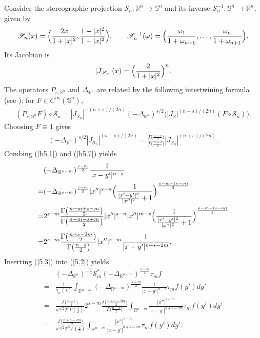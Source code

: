 \documentclass[12pt,reqno]{amsart}%
\theoremstyle{plain}
\numberwithin{equation}{section}
\begin{document}
Consider the stereographic projection \(\mathscr{S}_{n}: \mathbb{R}^n \to \mathbb{S}^n\) and its inverse \(\mathscr{S}_{n}^{-1}: \mathbb{S}^n \to \mathbb{R}^n\), given by
\[
\mathscr{S}_{n}(x) = \Bigl( \frac{2x}{1+|x|^2}, \frac{1-|x|^2}{1+|x|^2} \Bigr),\qquad
\mathscr{S}_{n}^{-1}(\omega) = \Bigl( \frac{\omega_1}{1+\omega_{n+1}},\dots, \frac{\omega_n}{1+\omega_{n+1}} \Bigr).
\]
Its Jacobian is
\begin{align}\label{Jacobian}
|J_{\mathscr{S}_{n}}|(x) = \Bigl( \frac{2}{1+|x|^2} \Bigr)^n.
\end{align}
The operators \(P_{s,\mathbb{S}^{n}}\) and \(\Delta_{\mathbb{R}^{n}}\) are related by the following intertwining formula (see \cite{Morpurgo}): for \(F\in C^{\infty}(\mathbb{S}^{n})\),
\begin{align}\label{5.6}
(P_{s,\mathbb{S}^{n}} F) \circ \mathscr{S}_{n}
= |J_{\mathscr{S}_{n}}|^{-(n+s)/(2n)}
(-\Delta_{\mathbb{R}^{n}})^{s/2}\bigl( |J_{\mathscr{S}}|^{(n-s)/(2n)} (F \circ \mathscr{S}_{n}) \bigr).
\end{align}
Choosing \(F\equiv 1\) gives
\begin{align}\label{b5.7}
(-\Delta_{\mathbb{R}^{n}})^{s/2}|J_{\mathscr{S}_{n}}|^{(n-s)/(2n)}
= \frac{\Gamma\bigl(\frac{n+s}{2}\bigr)}{\Gamma\bigl(\frac{n-s}{2}\bigr)}
|J_{\mathscr{S}_{n}}|^{(n+s)/(2n)} .
\end{align}
Combing (\ref{b5.1}) and (\ref{b5.7}) yields
\begin{align}\nonumber
&(-\Delta_{ \mathbb{R}^{n-m}})^{\frac{s-m}{2}}\frac{1}{|x-y'|^{n-s}}\\
\nonumber
=& (-\Delta_{ \mathbb{R}^{n-m}})^{\frac{s-m}{2}}
|x''|^{s-n}
\Bigl(\frac{1}{\frac{|x'-y'|^{2}}{|x''|^{2}}+1}\Bigr)^{\frac{n-m-(s-m)}{2}}\\
\nonumber
=& 2^{s-m}\frac{\Gamma\bigl(\frac{n-m+s-m}{2}\bigr)}
{\Gamma\bigl(\frac{n-m-s+m}{2}\bigr)}
|x''|^{s-n}|x''|^{m-s}
\Bigl(\frac{1}{\frac{|x'-y'|^{2}}{|x''|^{2}}+1}\Bigr)^{\frac{n-m+(s-m)}{2}}\\[2pt]
\label{5.3}
=& 2^{s-m}\frac{\Gamma\bigl(\frac{n+s-2m}{2}\bigr)}
{\Gamma\bigl(\frac{n-s}{2}\bigr)}
|x''|^{s-m}
\frac{1}{|x-y'|^{n+s-2m}} .
\end{align}
Inserting (\ref{5.3}) into (\ref{5.2}) yields
\begin{align}\nonumber
&(-\Delta_{\mathbb{R}^{n}})^{-\frac{s}{4}}\mathcal{S}_{m}^{\ast}
(-\Delta_{\mathbb{R}^{n-m}})^{\frac{s-m}{4}} \tau_{m}f\\[2pt]
\nonumber
=& \frac{1}{\gamma_{n}(s)}
\int_{\mathbb{R}^{n-m}}
(-\Delta_{ \mathbb{R}^{n-m}})^{\frac{s-m}{2}}\frac{1}{|x-y'|^{n-s}}
\tau_{m}f(y')dy'\\[2pt]
\nonumber
=& \frac{\Gamma\bigl(\frac{n-s}{2}\bigr)}
{\pi^{n/2}2^{s}\Gamma(\frac{s}{2})} 2^{s-m}\frac{\Gamma\bigl(\frac{n+s-2m}{2}\bigr)}
{\Gamma\bigl(\frac{n-s}{2}\bigr)}
\int_{\mathbb{R}^{n-m}}\frac{|x''|^{s-m}}{|x-y'|^{n+s-2m}}
\tau_{m}f(y')dy'\\[2pt]
\label{5.4}
=& \frac{\Gamma\bigl(\frac{n+s-2m}{2}\bigr)}
{\pi^{n/2}2^{m}\Gamma(\frac{s}{2})}
\int_{\mathbb{R}^{n-m}}\frac{|x''|^{s-m}}{|x-y'|^{n+s-2m}}
\tau_{m}f(y')dy'.
\end{align}
\end{document}
